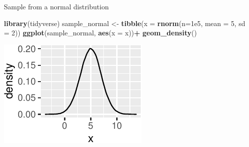 \documentclass[
  12pt,
  ignorenonframetext,
  aspectratio=169,
]{beamer}
\newenvironment{Shaded}{\begin{snugshade}}{\end{snugshade}}
\newcommand{\DataTypeTok}[1]{\textcolor[rgb]{0.13,0.29,0.53}{#1}}
\newcommand{\DecValTok}[1]{\textcolor[rgb]{0.00,0.00,0.81}{#1}}
\newcommand{\FloatTok}[1]{\textcolor[rgb]{0.00,0.00,0.81}{#1}}
\newcommand{\KeywordTok}[1]{\textcolor[rgb]{0.13,0.29,0.53}{\textbf{#1}}}
\newcommand{\NormalTok}[1]{#1}
\newcommand{\OperatorTok}[1]{\textcolor[rgb]{0.81,0.36,0.00}{\textbf{#1}}}
\newcommand{\StringTok}[1]{\textcolor[rgb]{0.31,0.60,0.02}{#1}}
\begin{document}
\begin{frame}[fragile]{Sample from a normal distribution}
\protect\hypertarget{sample-from-a-normal-distribution}{}

\begin{Shaded}
\begin{Highlighting}[]
\KeywordTok{library}\NormalTok{(tidyverse)}
\NormalTok{sample_normal <-}\StringTok{ }\KeywordTok{tibble}\NormalTok{(}\DataTypeTok{x =} \KeywordTok{rnorm}\NormalTok{(}\DataTypeTok{n=}\FloatTok{1e5}\NormalTok{, }\DataTypeTok{mean =} \DecValTok{5}\NormalTok{, }\DataTypeTok{sd =} \DecValTok{2}\NormalTok{))}
\KeywordTok{ggplot}\NormalTok{(sample_normal, }\KeywordTok{aes}\NormalTok{(}\DataTypeTok{x =}\NormalTok{ x))}\OperatorTok{+}
\StringTok{   }\KeywordTok{geom_density}\NormalTok{()}
\end{Highlighting}
\end{Shaded}

\begin{center}\includegraphics{Lecture-2_files/figure-beamer/unnamed-chunk-1-1} \end{center}

\end{frame}
\end{document}
